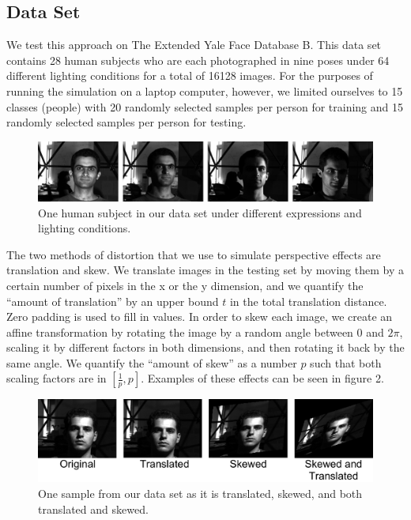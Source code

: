 \documentclass{amsart}
\theoremstyle{definition}
\theoremstyle{remark}
\begin{document}
\subsection{Data Set}

We test this approach on The Extended Yale Face Database B. This data set contains 28 human subjects who are each photographed in nine poses under 64 different lighting conditions for a total of 16128 images. For the purposes of running the simulation on a laptop computer, however, we limited ourselves to 15 classes (people) with 20 randomly selected samples per person for training and 15 randomly selected samples per person for testing.

\begin{figure}
\caption{One human subject in our data set under different expressions and lighting conditions.}
\includegraphics[scale=0.13]{figures/Dataset.png}
\end{figure}

The two methods of distortion that we use to simulate perspective effects are translation and skew. We translate images in the testing set by moving them by a certain number of pixels in the x or the y dimension, and we quantify the ``amount of translation'' by an upper bound $t$ in the total translation distance. Zero padding is used to fill in values. In order to skew each image, we create an affine transformation by rotating the image by a random angle between 0 and $2\pi$, scaling it by different factors in both dimensions, and then rotating it back by the same angle. We quantify the ``amount of skew'' as a number $p$ such that both scaling factors are in $[\frac{1}{p}, p]$. Examples of these effects can be seen in figure 2.

\begin{figure}
\caption{One sample from our data set as it is translated, skewed, and both translated and skewed.}
\includegraphics[scale=0.23]{figures/Distortion.png}
\end{figure}
\end{document}
